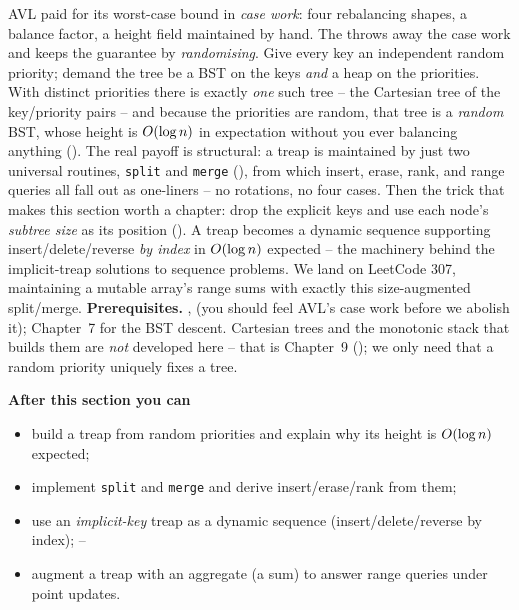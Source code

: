 \begin{topicintro}
AVL paid for its worst-case bound in \emph{case work}: four rebalancing shapes, a balance factor, a
height field maintained by hand. The  throws away the case work and keeps the guarantee by
\emph{randomising}. Give every key an independent random priority; demand the tree be a BST on the keys
\emph{and} a heap on the priorities. With distinct priorities there is exactly \emph{one} such tree --
the Cartesian tree of the key/priority pairs -- and because the priorities are random, that tree is a
\emph{random} BST, whose height is $O(\log n)$ in expectation without you ever balancing anything
(). The real payoff is structural: a treap is maintained by just two universal
routines, \texttt{split} and \texttt{merge} (), from which insert, erase, rank,
and range queries all fall out as one-liners -- no rotations, no four cases. Then the trick that makes
this section worth a chapter: drop the explicit keys and use each node's \emph{subtree size} as its
position (). A treap becomes a dynamic sequence supporting insert/delete/reverse
\emph{by index} in $O(\log n)$ expected -- the machinery behind the implicit-treap solutions to
sequence problems. We land on LeetCode 307, maintaining a mutable array's range sums with exactly this
size-augmented split/merge.
\textbf{Prerequisites.} ,  (you should feel AVL's case work before
we abolish it); Chapter~7 for the BST descent. Cartesian trees and the monotonic stack that builds them
are \emph{not} developed here -- that is Chapter~9 (); we only need that a random priority
uniquely fixes a tree.

\textbf{After this section you can}
\begin{itemize}[nosep]
  \item build a treap from random priorities and explain why its height is $O(\log n)$ expected; \hfill{}
  \item implement \texttt{split} and \texttt{merge} and derive insert/erase/rank from them; \hfill{}
  \item use an \emph{implicit-key} treap as a dynamic sequence (insert/delete/reverse by index); \hfill{}--
  \item augment a treap with an aggregate (a sum) to answer range queries under point updates. \hfill{}
\end{itemize}
\end{topicintro}

